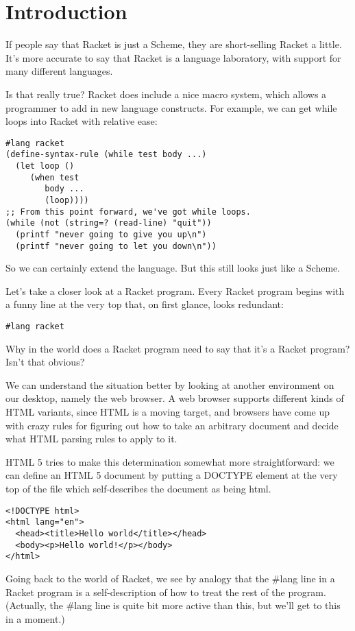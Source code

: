 \documentclass{article}
\begin{document}
\section{Introduction}

If people say that Racket is just a Scheme, they are short-selling Racket a little. It’s more accurate to say that Racket is a language laboratory, with support for many different languages.

Is that really true? Racket does include a nice macro system, which allows a programmer to add in new language constructs. For example, we can get while loops into Racket with relative ease:
\begin{verbatim}
#lang racket
(define-syntax-rule (while test body ...)
  (let loop ()
     (when test
        body ...
        (loop))))
;; From this point forward, we've got while loops.
(while (not (string=? (read-line) "quit"))
  (printf "never going to give you up\n")
  (printf "never going to let you down\n"))
\end{verbatim}
So we can certainly extend the language. But this still looks just like a Scheme.

Let’s take a closer look at a Racket program. Every Racket program begins with a funny line at the very top that, on first glance, looks redundant:
\begin{verbatim}
#lang racket
\end{verbatim}
Why in the world does a Racket program need to say that it’s a Racket program? Isn’t that obvious?


We can understand the situation better by looking at another environment on our desktop, namely the web browser. A web browser supports different kinds of HTML variants, since HTML is a moving target, and browsers have come up with crazy rules for figuring out how to take an arbitrary document and decide what HTML parsing rules to apply to it.

HTML 5 tries to make this determination somewhat more straightforward: we can define an HTML 5 document by putting a DOCTYPE element at the very top of the file which self-describes the document as being html.
\begin{verbatim}
<!DOCTYPE html>
<html lang="en">
  <head><title>Hello world</title></head>
  <body><p>Hello world!</p></body>
</html>
\end{verbatim}

Going back to the world of Racket, we see by analogy that the #lang line in a Racket program is a self-description of how to treat the rest of the program. (Actually, the #lang line is quite bit more active than this, but we’ll get to this in a moment.)
\end{document}
